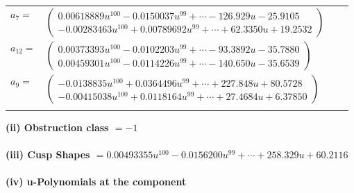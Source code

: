 \documentclass[1p]{elsarticle_modified}
\theoremstyle{definition}
\begin{document}
\begin{tabular}{m{7pt} m{180pt} m{7pt} m{180pt} }
\flushright $a_{7}=$&$\begin{pmatrix}0.00618889 u^{100}-0.0150037 u^{99}+\cdots-126.929 u-25.9105\\-0.00283463 u^{100}+0.00789692 u^{99}+\cdots+62.3350 u+19.2532\end{pmatrix}$ \\
\flushright $a_{12}=$&$\begin{pmatrix}0.00373393 u^{100}-0.0102203 u^{99}+\cdots-93.3892 u-35.7880\\0.00459301 u^{100}-0.0114226 u^{99}+\cdots-140.650 u-35.6539\end{pmatrix}$ \\
\flushright $a_{9}=$&$\begin{pmatrix}-0.0138835 u^{100}+0.0364496 u^{99}+\cdots+227.848 u+80.5728\\-0.00415038 u^{100}+0.0118164 u^{99}+\cdots+27.4684 u+6.37850\end{pmatrix}$\\&\end{tabular}
\flushleft \textbf{(ii) Obstruction class $= -1$}\\~\\
\flushleft \textbf{(iii) Cusp Shapes $= 0.00493355 u^{100}-0.0156200 u^{99}+\cdots+258.329 u+60.2116$}\\~\\
\newpage\renewcommand{\arraystretch}{1}
\flushleft \textbf{(iv) u-Polynomials at the component}\newline \\
\end{document}
